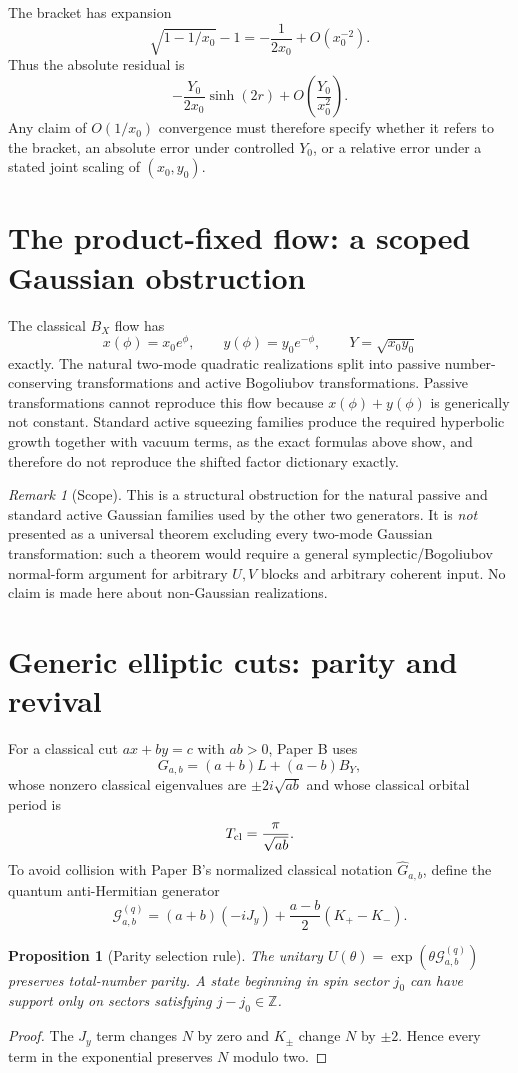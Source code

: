 \documentclass[11pt]{amsart}
\newtheorem{proposition}[theorem]{Proposition}
\theoremstyle{remark}
\newtheorem*{remark}{Remark}
\begin{document}
The bracket has expansion
\[
\sqrt{1-1/x_0}-1=-\frac1{2x_0}+O(x_0^{-2}).
\]
Thus the absolute residual is
\[
-\frac{Y_0}{2x_0}\sinh(2r)+O\!\left(\frac{Y_0}{x_0^2}\right).
\]
Any claim of $O(1/x_0)$ convergence must therefore specify whether it refers to the bracket, an absolute error under controlled $Y_0$, or a relative error under a stated joint scaling of $(x_0,y_0)$.

\section{The product-fixed flow: a scoped Gaussian obstruction}
The classical $B_X$ flow has
\[
x(\phi)=x_0e^\phi,\qquad y(\phi)=y_0e^{-\phi},\qquad Y=\sqrt{x_0y_0}
\]
exactly.  The natural two-mode quadratic realizations split into passive number-conserving transformations and active Bogoliubov transformations.  Passive transformations cannot reproduce this flow because $x(\phi)+y(\phi)$ is generically not constant.  Standard active squeezing families produce the required hyperbolic growth together with vacuum terms, as the exact formulas above show, and therefore do not reproduce the shifted factor dictionary exactly.

\begin{remark}[Scope]
This is a structural obstruction for the natural passive and standard active Gaussian families used by the other two generators.  It is \emph{not} presented as a universal theorem excluding every two-mode Gaussian transformation: such a theorem would require a general symplectic/Bogoliubov normal-form argument for arbitrary $U,V$ blocks and arbitrary coherent input.  No claim is made here about non-Gaussian realizations.
\end{remark}

\section{Generic elliptic cuts: parity and revival}
For a classical cut $ax+by=c$ with $ab>0$, Paper B uses
\[
G_{a,b}=(a+b)L+(a-b)B_Y,
\]
whose nonzero classical eigenvalues are $\pm2i\sqrt{ab}$ and whose classical orbital period is
\[
T_{\rm cl}=\frac{\pi}{\sqrt{ab}}.
\]
To avoid collision with Paper B's normalized classical notation $\widehat G_{a,b}$, define the quantum anti-Hermitian generator
\[
\mathcal G^{(q)}_{a,b}=(a+b)(-iJ_y)+\frac{a-b}{2}(K_+-K_-).
\]

\begin{proposition}[Parity selection rule]\label{prop:parity}
The unitary $U(\theta)=\exp(\theta\mathcal G^{(q)}_{a,b})$ preserves total-number parity.  A state beginning in spin sector $j_0$ can have support only on sectors satisfying $j-j_0\in\mathbb Z$.
\end{proposition}
\begin{proof}
The $J_y$ term changes $N$ by zero and $K_\pm$ change $N$ by $\pm2$.  Hence every term in the exponential preserves $N$ modulo two.
\end{proof}
\end{document}
